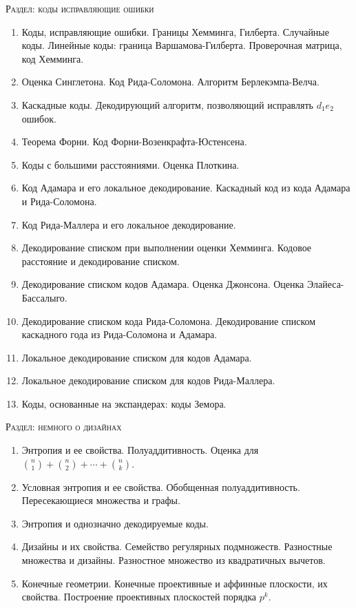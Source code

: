 \centerline{\textsc{Раздел: коды исправляющие ошибки}}
\begin{enumerate}
    \item Коды, исправляющие ошибки. Границы Хемминга, Гилберта. Случайные коды. Линейные коды: граница
        Варшамова-Гилберта. Проверочная матрица, код Хемминга.
    \item Оценка Синглетона. Код Рида-Соломона. Алгоритм Берлекэмпа-Велча.
    \item Каскадные коды. Декодирующий алгоритм, позволяющий исправлять $d_1 e_2$ ошибок.
    \item Теорема Форни. Код Форни-Возенкрафта-Юстенсена.
    \item Коды с большими расстояниями. Оценка Плоткина.
    \item Код Адамара и его локальное декодирование. Каскадный код из кода Адамара и Рида-Соломона.
    \item Код Рида-Маллера и его локальное декодирование.
    \item Декодирование списком при выполнении оценки Хемминга. Кодовое расстояние и декодирование
        списком.
    \item Декодирование списком кодов Адамара. Оценка Джонсона. Оценка Элайеса-Бассалыго.
    \item Декодирование списком кода Рида-Соломона. Декодирование списком каскадного года из
        Рида-Соломона и Адамара.
    \item Локальное декодирование списком для кодов Адамара.
    \item Локальное декодирование списком для кодов Рида-Маллера.
    \item Коды, основанные на экспандерах: коды Земора.
\end{enumerate}

\centerline{\textsc{Раздел: немного о дизайнах}}
\begin{enumerate}
    \item Энтропия и ее свойства. Полуаддитивность. Оценка для $\binom{n}{1} + \binom{n}{2} + \cdots +
        \binom{n}{k}$.
    \item Условная энтропия и ее свойства. Обобщенная полуаддитивность. Пересекающиеся множества и графы.
    \item Энтропия и однозначно декодируемые коды.
    \item Дизайны и их свойства. Семейство регулярных подмножеств. Разностные множества и
        дизайны. Разностное множество из квадратичных вычетов.
    \item Конечные геометрии. Конечные проективные и аффинные плоскости, их свойства. Построение
        проективных плоскостей порядка $p^k$.
\end{enumerate}